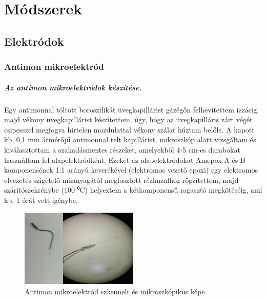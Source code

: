 \chapter{Módszerek}
\pagestyle{headings}
\section{Elektródok}
\subsection{Antimon mikroelektród}
\paragraph{Az antimon mikroelektródok készítése.}
Egy antimonnal töltött boroszilikát üvegkapillárist gázégőn felhevítettem izzásig, majd vékony üvegkapillárist készítettem, úgy, hogy az üvegkapilláris zárt végét csipesszel megfogva hirtelen mozdulattal vékony szálat húztam belőle. A kapott kb. 0,1 mm átmérőjű antimonnal telt kapillárist, mikroszkóp alatt vizsgáltam és kiválasztottam a szakadásmentes részeket, amelyekből 4-5 cm-es darabokat használtam fel alapelektródként. Ezeket az alapelektródokat Amepox A és B komponensének 1:1 arányú keverékével (elektromos vezető epoxi) egy elektromos elvezetés szigetelő műanyagától megfosztott rézhuzalhoz rögzítettem, majd szárítószekrénybe (100 ⁰C) helyeztem a kétkomponensű ragasztó megkötéséig, ami kb. 1 órát vett igénybe.

\begin{figure}[h]
\centering
\includegraphics[width=0.5\textwidth]{img/antimon.png}
\caption{Antimon mikroelektród szkennelt és mikroszkópikus képe.}
\label{fig:ionophores}
\end{figure}

